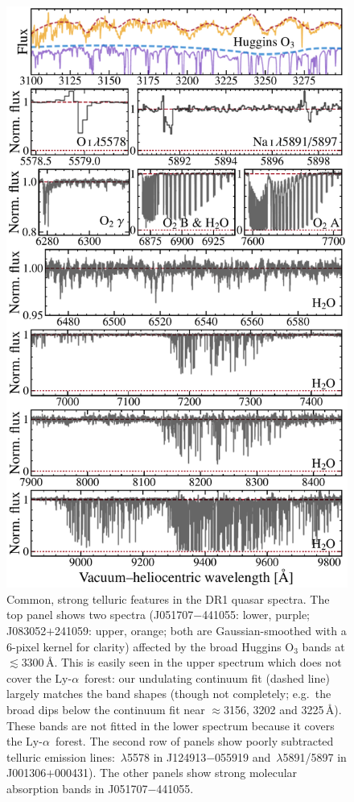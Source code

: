 \documentclass[fleqn,usenatbib,usedcolumn]{mnras}
\renewcommand{\la}{\lesssim} %
\newcommand{\lya}{\ensuremath{\textrm{Ly-}\alpha}}
\begin{document}
\begin{figure}
\begin{center}
\includegraphics[width=0.90\columnwidth]{DR1_telluric.pdf}
\vspace{-1em}
\caption{Common, strong telluric features in the DR1 quasar spectra. The top panel shows two spectra (J051707$-$441055: lower, purple; J083052$+$241059: upper, orange; both are Gaussian-smoothed with a 6-pixel kernel for clarity) affected by the broad Huggins O$_3$ bands at $\la$3300\,\AA. This is easily seen in the upper spectrum which does not cover the \lya\ forest: our undulating continuum fit (dashed line) largely matches the band shapes (though not completely; e.g.\ the broad dips below the continuum fit near $\approx$3156, 3202 and 3225\,\AA). These bands are not fitted in the lower spectrum because it covers the \lya\ forest. The second row of panels show poorly subtracted telluric emission lines: \,$\lambda$5578 in J124913$-$055919 and \,$\lambda$5891/5897 in J001306$+$000431). The other panels show strong molecular absorption bands in J051707$-$441055.}
\label{f:telluric}
\end{center}
\end{figure}
\end{document}
